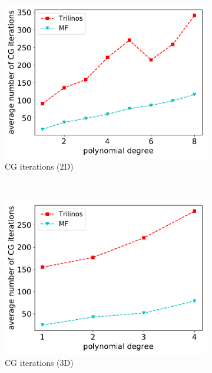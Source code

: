 \documentclass[AMA,STIX1COL]{WileyNJD-v2}
\begin{document}
\begin{figure}[!ht]
  \begin{subfigure}[b]{0.49\textwidth}
    \centering
    \includegraphics[width=\textwidth]{IWR_newest_patched_cg2d.pdf}
    \caption{CG iterations (2D)}
    \label{fig:benchmark_miehe_IWR_cg2}
  \end{subfigure}
  ~
  \begin{subfigure}[b]{0.49\textwidth}
    \centering
    \includegraphics[width=\textwidth]{IWR_newest_patched_cg3d.pdf}
    \caption{CG iterations (3D)}
    \label{fig:benchmark_miehe_IWR_cg3}
  \end{subfigure}
  ~
  \begin{subfigure}[b]{0.49\textwidth}

\end{subfigure}
\end{figure}
\end{document}
